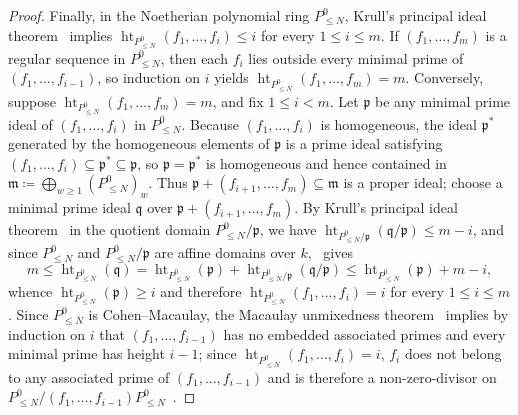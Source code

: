 \documentclass[a4paper, 12pt, reqno]{amsart}
\theoremstyle{remark}
\begin{document}
\begin{proof}
  Finally, in the Noetherian polynomial ring $P^0_{\le N}$,
  Krull's principal ideal theorem~\cite[Theorem~10.2]{eisenbud_commalg_1995} implies $\operatorname{ht}_{P^0_{\le N}}(f_1, \dots, f_i) \le i$ for every $1 \le i \le m$.
  If $(f_1, \dots, f_m)$ is a regular sequence in $P^0_{\le N}$,
  then each $f_i$ lies outside every minimal prime of $(f_1, \dots, f_{i - 1})$,
  so induction on $i$ yields $\operatorname{ht}_{P^0_{\le N}}(f_1, \dots, f_m) = m$.
  Conversely, suppose $\operatorname{ht}_{P^0_{\le N}}(f_1, \dots, f_m) = m$,
  and fix $1 \le i < m$.
  Let $\mathfrak{p}$ be any minimal prime ideal of $(f_1, \dots, f_i)$ in $P^0_{\le N}$.
  Because $(f_1, \dots, f_i)$ is homogeneous,
  the ideal $\mathfrak{p}^*$ generated by the homogeneous elements of $\mathfrak{p}$ is a prime ideal satisfying $(f_1, \dots, f_i) \subseteq \mathfrak{p}^* \subseteq \mathfrak{p}$,
  so $\mathfrak{p} = \mathfrak{p}^*$ is homogeneous and hence contained in $\mathfrak{m} \coloneq \bigoplus_{w \ge 1} (P^0_{\le N})_w$.
  Thus $\mathfrak{p} + (f_{i + 1}, \dots, f_m) \subseteq \mathfrak{m}$ is a proper ideal;
  choose a minimal prime ideal $\mathfrak{q}$ over $\mathfrak{p} + (f_{i + 1}, \dots, f_m)$.
  By Krull's principal ideal theorem~\cite[Theorem~10.2]{eisenbud_commalg_1995} in the quotient domain $P^0_{\le N} / \mathfrak{p}$,
  we have $\operatorname{ht}_{P^0_{\le N} / \mathfrak{p}}(\mathfrak{q} / \mathfrak{p}) \le m - i$,
  and since $P^0_{\le N}$ and $P^0_{\le N} / \mathfrak{p}$ are affine domains over $k$,~\cite[Corollary~13.4]{eisenbud_commalg_1995} gives
  \begin{equation*}
    m \le \operatorname{ht}_{P^0_{\le N}}(\mathfrak{q})
    = \operatorname{ht}_{P^0_{\le N}}(\mathfrak{p}) + \operatorname{ht}_{P^0_{\le N} / \mathfrak{p}}(\mathfrak{q} / \mathfrak{p})
    \le \operatorname{ht}_{P^0_{\le N}}(\mathfrak{p}) + m - i,
  \end{equation*}
  whence $\operatorname{ht}_{P^0_{\le N}}(\mathfrak{p}) \ge i$ and therefore $\operatorname{ht}_{P^0_{\le N}}(f_1, \dots, f_i) = i$ for every $1 \le i \le m$.
  Since $P^0_{\le N}$ is Cohen--Macaulay,
  the Macaulay unmixedness theorem~\cite[Corollary~18.14]{eisenbud_commalg_1995} implies by induction on $i$ that $(f_1, \dots, f_{i - 1})$ has no embedded associated primes and every minimal prime has height $i - 1$;
  since $\operatorname{ht}_{P^0_{\le N}}(f_1, \dots, f_i) = i$,
  $f_i$ does not belong to any associated prime of $(f_1, \dots, f_{i - 1})$ and is therefore a non-zero-divisor on $P^0_{\le N} / (f_1, \dots, f_{i - 1})P^0_{\le N}$~\cite[Theorem~3.1(b)]{eisenbud_commalg_1995}.
\end{proof}
\end{document}
